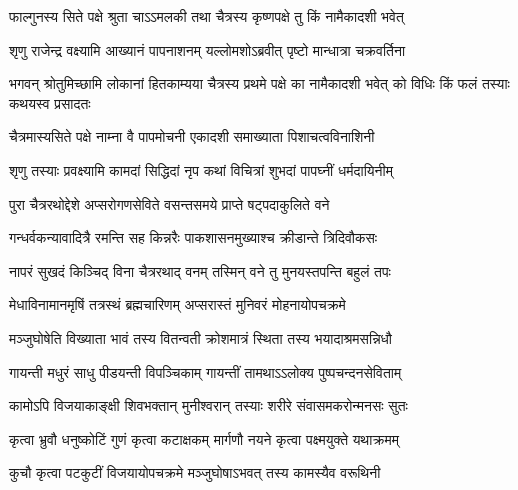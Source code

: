 \label{sec:padma-chaitra-krishna-papamochani}

\ganapatyadiDhyanam
\padmaPuranam



\twolineshloka
{फाल्गुनस्य सिते पक्षे श्रुता चाऽऽमलकी तथा}
{चैत्रस्य कृष्णपक्षे तु किं नामैकादशी भवेत्}%


\twolineshloka
{शृणु राजेन्द्र वक्ष्यामि आख्यानं पापनाशनम्}
{यल्लोमशोऽब्रवीत् पृष्टो मान्धात्रा चक्रवर्तिना}%


\threelineshloka
{भगवन् श्रोतुमिच्छामि लोकानां हितकाम्यया}
{चैत्रस्य प्रथमे पक्षे का नामैकादशी भवेत्}
{को विधिः किं फलं तस्याः कथयस्व प्रसादतः}%


\twolineshloka
{चैत्रमास्यसिते पक्षे नाम्ना वै पापमोचनी}
{एकादशी समाख्याता पिशाचत्वविनाशिनी}%

\twolineshloka
{शृणु तस्याः प्रवक्ष्यामि कामदां सिद्धिदां नृप}
{कथां विचित्रां शुभदां पापघ्नीं धर्मदायिनीम्}%

\twolineshloka
{पुरा चैत्ररथोद्देशे अप्सरोगणसेविते}
{वसन्तसमये प्राप्ते षट्पदाकुलिते वने}%

\twolineshloka
{गन्धर्वकन्यावादित्रै रमन्ति सह किन्नरैः}
{पाकशासनमुख्याश्च क्रीडान्ते त्रिदिवौकसः}%

\twolineshloka
{नापरं सुखदं किञ्चिद् विना चैत्ररथाद् वनम्}
{तस्मिन् वने तु मुनयस्तपन्ति बहुलं तपः}%

\twolineshloka
{मेधाविनामानमृषिं तत्रस्थं ब्रह्मचारिणम्}
{अप्सरास्तं मुनिवरं मोहनायोपचक्रमे}%

\twolineshloka
{मञ्जुघोषेति विख्याता भावं तस्य वितन्वती}
{क्रोशमात्रं स्थिता तस्य भयादाश्रमसन्निधौ}%

\twolineshloka
{गायन्ती मधुरं साधु पीडयन्ती विपञ्चिकाम्}
{गायन्तीं तामथाऽऽलोक्य पुष्पचन्दनसेविताम्}%

\twolineshloka
{कामोऽपि विजयाकाङ्क्षी शिवभक्तान् मुनीश्वरान्}
{तस्याः शरीरे संवासमकरोन्मनसः सुतः}%

\twolineshloka
{कृत्वा भ्रुवौ धनुष्कोटिं गुणं कृत्वा कटाक्षकम्}
{मार्गणौ नयने कृत्वा पक्ष्मयुक्ते यथाक्रमम्}%

\twolineshloka
{कुचौ कृत्वा पटकुटीं विजयायोपचक्रमे}
{मञ्जुघोषाऽभवत् तस्य कामस्यैव वरूथिनी}%


